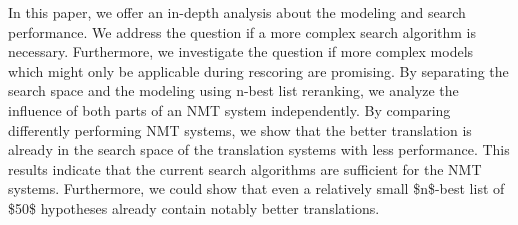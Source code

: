 In this paper, we offer an in-depth analysis about the modeling and search performance. We address the question if a more complex search algorithm is necessary. Furthermore, we investigate the question if more complex models which might only be applicable during rescoring are promising. By separating the search space and the modeling using n-best list reranking, we analyze the influence of both parts of an NMT system independently. By comparing differently performing NMT systems, we show that the better translation is already in the search space of the translation systems with less performance. This results indicate that the current search algorithms are sufficient for the NMT systems. Furthermore, we could show that even a relatively small \$n\$-best list of \$50\$ hypotheses already contain notably better translations.
